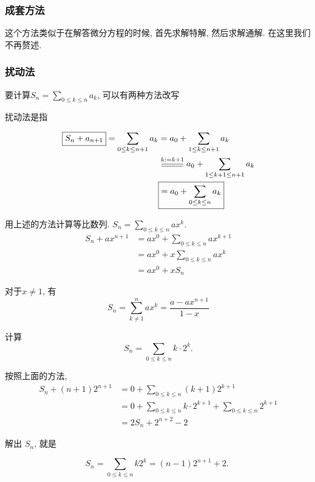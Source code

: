 \documentclass{ctexart}
\begin{document}
\subsubsection{成套方法} 这个方法类似于在解答微分方程的时候, 首先求解特解, 然后求解通解. 在这里我们不再赘述.

\subsubsection{扰动法} 要计算$S_n=\sum_{0 \leq k \leq n} a_k$, 可以有两种方法改写

\begin{proposition}
	扰动法是指

	
		\begin{align*}
			\boxed{S_{n}+a_{n+1}}=\sum_{0\leq k\leq n+1}a_{k} & =a_{0}+\sum_{1\leq k\leq n+1}a_{k}                        \\
			                                                  & \varsub{k:=k+1}{0.9cm}a_{0}+\sum_{1\leq k+1\leq n+1}a_{k} \\
			                                                  & \boxed{=a_{0}+\sum_{0\leq k\leq n}a_{k}}
		\end{align*}
	

\end{proposition}

\begin{example}
	用上述的方法计算等比数列. $S_n=\sum_{0 \leq k \leq n} a x^k$.
	$$
		\begin{aligned}
			S_n+a x^{n+1} & =a x^0+\sum_{0 \leq k \leq n} a x^{k+1} \\
			              & =a x^0+x \sum_{0 \leq k \leq n} a x^k   \\
			              & =a x^0+x S_n
		\end{aligned}
	$$

	对于$x\neq 1$, 有
	$$
		S_n=\sum_{k\neq 1}^n a x^k=\frac{a-a x^{n+1}}{1-x}
	$$
\end{example}

\begin{example}[等差数列乘等比数列]
	计算
	$$
		S_n=\sum_{0 \leq k \leq n} k \cdot 2^k.
	$$

	按照上面的方法,
	$$
		\begin{aligned}
			S_n+(n+1) 2^{n+1} & =0+\sum_{0 \leq k \leq n}(k+1) 2^{k+1}                                    \\
			                  & = 0+\sum_{0 \leq k \leq n} k \cdot 2^{k+1}+\sum_{0 \leq k \leq n} 2^{k+1} \\
			                  & =2 S_n+ 2^{n+2}-2
		\end{aligned}
	$$

	解出 $S_n$, 就是

	$$
		S_n=\sum_{0 \leq k \leq n} k 2^k=(n-1) 2^{n+1}+2 \text {. }
	$$
\end{example}
\end{document}

